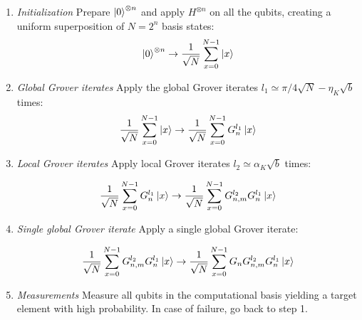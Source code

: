 \bigskip
\begin{enumerate}
\item \emph{Initialization}\newline
Prepare $\ket{0}^{\otimes n}$ and apply $H^{\otimes n}$ on all the qubits, creating a uniform superposition of $N=2^n$ basis states:
\begin{align*}
    \ket{0}^{\otimes n} \to \frac{1}{\sqrt{N}}\displaystyle\sum_{x=0}^{N-1} \ket{x}
\end{align*}

\item \emph{Global Grover iterates}\newline
Apply the global Grover iterates $l_1 \simeq \pi / 4 \sqrt{N} - \eta_K\sqrt{b}$ times:
\begin{align*}
	\frac{1}{\sqrt{N}}\displaystyle\sum_{x=0}^{N-1} \ket{x} \to \frac{1}{\sqrt{N}}\displaystyle\sum_{x=0}^{N-1} G_{n}^{l_1}\ket{x}
\end{align*}

\item \emph{Local Grover iterates}\newline
Apply local Grover iterates $l_2 \simeq \alpha_K\sqrt{b}$ times: 

\begin{align*}
	\frac{1}{\sqrt{N}}\displaystyle\sum_{x=0}^{N-1} G_{n}^{l_1}\ket{x} \to \frac{1}{\sqrt{N}}\displaystyle\sum_{x=0}^{N-1} G_{n,m}^{l_2}G_{n}^{l_1}\ket{x}
\end{align*}

\item \emph{Single global Grover iterate}\newline
Apply a single global Grover iterate: 

\begin{align*}
	\frac{1}{\sqrt{N}}\displaystyle\sum_{x=0}^{N-1} G_{n,m}^{l_2}G_{n}^{l_1}\ket{x} \to \frac{1}{\sqrt{N}}\displaystyle\sum_{x=0}^{N-1} G_{n} G_{n,m}^{l_2}G_{n}^{l_1}\ket{x}
\end{align*}


\item \emph{Measurements}\newline
    Measure all qubits in the computational basis yielding a target element with high probability. In case of failure, go back to step 1.
\end{enumerate}

